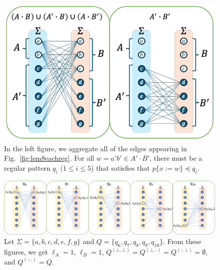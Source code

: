 \begin{figure}[t]
  \begin{center}
    \includegraphics[scale=0.525]{figs/lem8totalreg.pdf}
    \caption{In the left figure, we aggregate all of the edges appearing in Fig.~\ref{fig:lem8eachreg}. For all $w=a'b'\in A'\cdot B'$, there must be a regular pattern $q_i$ $(1\leq i\leq 5$) that satisfies that $p \{ x:=w \} \preceq q_i$.}\label{fig:lem8totalreg}
  \end{center}
\end{figure}


\begin{figure}[t]
  \begin{center}
    \includegraphics[scale=0.8]{figs/lem8eachreg-suppl.png}
    \caption{Let $\Sigma=\{a,b,c,d,e,f,g\}$ {\color{red} and} $Q=\{q_6,q_7,q_8,q_9,q_{10}\}$. From these figures, we get $\ell_A=1$, $\ell_B=1$, $Q^{(\bot,\bot)}=Q^{(\bot,\cdot)}=Q^{(\cdot,\bot)}=\emptyset$, and $Q^{(\cdot,\cdot)}=Q$.}\label{fig:lem8eachreg-suppl}
  \end{center}
\end{figure}

